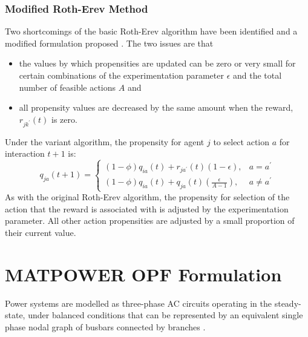 \subsection{Modified Roth-Erev Method}
\label{sec:variant}
Two shortcomings of the basic Roth-Erev algorithm have been identified and a
modified formulation proposed \cite{nicolaisen:2001}.  The two issues are that
\begin{itemize}
  \item the values by which propensities are updated can be zero or very small
  for certain combinations of the experimentation parameter $\epsilon$ and
  the total number of feasible actions $A$ and
  \item all propensity values are decreased by the same amount when the reward,
  $r_{jk^\prime}(t)$ is zero.
\end{itemize}
Under the variant algorithm, the propensity for agent $j$ to select action $a$
for interaction $t+1$ is:
\begin{equation}
q_{ja}(t+1) =
\begin{cases}
(1-\phi)q_{ia}(t) + r_{ja^\prime}(t)(1-\epsilon), & \text{$a = a^\prime$} \\
(1-\phi)q_{ia}(t) + q_{ja}(t)(\frac{\epsilon}{A-1}), & \text{$a \ne
a^\prime$}
\end{cases}
\end{equation}
As with the original Roth-Erev algorithm, the propensity for selection of the
action that the reward is associated with is adjusted by the experimentation
parameter.  All other action propensities are adjusted by a small proportion of
their current value.


\chapter{MATPOWER OPF Formulation}
\label{sec:power_system_model}
Power systems are modelled as three-phase AC circuits operating in the
steady-state, under balanced conditions that can be represented by an
equivalent single phase nodal graph of busbars connected by branches
\cite{grainger:psa}.


